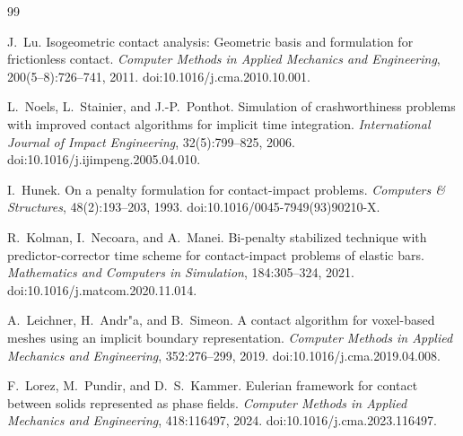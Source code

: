 ﻿\documentclass[12pt, a4paper]{ctexart}
\theoremstyle{plain}
\theoremstyle{remark}
\begin{document}
\begin{thebibliography}{99}

J.~Lu.
Isogeometric contact analysis: Geometric basis and formulation for frictionless contact.
\emph{Computer Methods in Applied Mechanics and Engineering}, 200(5--8):726--741, 2011.
doi:10.1016/j.cma.2010.10.001.

L.~Noels, L.~Stainier, and J.-P.~Ponthot.
Simulation of crashworthiness problems with improved contact algorithms for implicit time integration.
\emph{International Journal of Impact Engineering}, 32(5):799--825, 2006.
doi:10.1016/j.ijimpeng.2005.04.010.

I.~Hunek.
On a penalty formulation for contact-impact problems.
\emph{Computers \& Structures}, 48(2):193--203, 1993.
doi:10.1016/0045-7949(93)90210-X.

R.~Kolman, I.~Necoara, and A.~Manei.
Bi-penalty stabilized technique with predictor-corrector time scheme for contact-impact problems of elastic bars.
\emph{Mathematics and Computers in Simulation}, 184:305--324, 2021.
doi:10.1016/j.matcom.2020.11.014.

A.~Leichner, H.~Andr"a, and B.~Simeon.
A contact algorithm for voxel-based meshes using an implicit boundary representation.
\emph{Computer Methods in Applied Mechanics and Engineering}, 352:276--299, 2019.
doi:10.1016/j.cma.2019.04.008.

F.~Lorez, M.~Pundir, and D.~S.~Kammer.
Eulerian framework for contact between solids represented as phase fields.
\emph{Computer Methods in Applied Mechanics and Engineering}, 418:116497, 2024.
doi:10.1016/j.cma.2023.116497.

\end{thebibliography}
\end{document}
